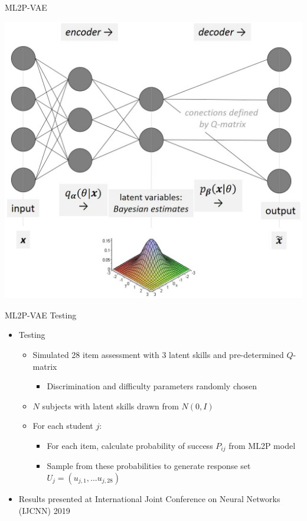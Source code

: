 \documentclass{beamer}
\theoremstyle{definition}
\begin{document}
\begin{frame}{ML2P-VAE}
\begin{center}
\includegraphics[scale=0.45]{img/ml2p_vae.jpg}
\end{center}
\end{frame}

\begin{frame}{ML2P-VAE Testing}
\begin{itemize}
  \item Testing
  \begin{itemize}
    \item Simulated 28 item assessment with 3 latent skills and pre-determined $Q$-matrix 
    \begin{itemize}
      \item Discrimination and difficulty parameters randomly chosen 
    \end{itemize}
    \item $N$ subjects with latent skills drawn from $N(0,I)$
    \item<2-> For each student $j$:
    \begin{itemize}
      \item<2-> For each item, calculate probability of success $P_{ij}$ from ML2P model
      \item<2-> Sample from these probabilities to generate response set $U_j = (u_{j,1},...u_{j,28})$
    \end{itemize}
  \end{itemize}
  \item<3-> Results presented at International Joint Conference on Neural Networks (IJCNN) 2019
\end{itemize}
\end{frame}
\end{document}
